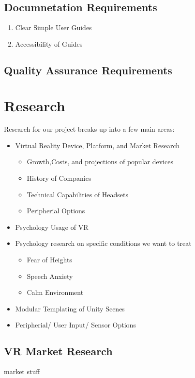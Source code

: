 \documentclass[a4paper,10pt]{article}
\begin{document}
	\subsection{Documnetation Requirements}
	\begin{enumerate}
	 \item Clear Simple User Guides
	 \item Accessibility of Guides
	\end{enumerate}
	\subsection{Quality Assurance Requirements}

	
	
\pagebreak
\section{Research}
Research for our project breaks up into a few main areas:
\begin{itemize}
\item Virtual Reality Device, Platform, and Market Research
	\begin{itemize}
	\item Growth,Costs, and projections of popular devices
	\item History of Companies
	\item Technical Capabilities of Headsets
	\item Peripherial Options
	\end{itemize}
\item Psychology Usage of VR
\item Psychology research on specific conditions we want to treat
	\begin{itemize}
	\item Fear of Heights
	\item Speech Anxiety
	\item Calm Environment
	\end{itemize}
\item Modular Templating of Unity Scenes
\item Peripherial/ User Input/ Sensor Options
\end{itemize}
\pagebreak
\subsection{VR Market Research}
market stuff
\pagebreak
\end{document}
